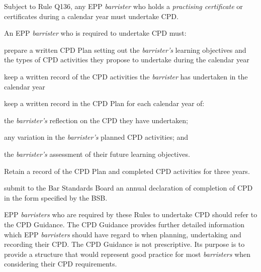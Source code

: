 


Subject to Rule Q136, any EPP \emph{barrister} who holds a
\emph{practising certificate} or certificates during a calendar year
must undertake CPD.


An EPP \emph{barrister} who is required to undertake CPD must:
\nl
 \item prepare a written CPD Plan setting out the \emph{barrister's}
learning objectives and the types of CPD activities they propose to
undertake during the calendar year

 \item keep a written record of the CPD activities the \emph{barrister} has
undertaken in the calendar year

 \item keep a written record in the CPD Plan for each calendar year of:
\al
 \item the \emph{barrister's} reflection on the CPD they have undertaken;

 \item any variation in the \emph{barrister's} planned CPD activities; and

 \item the \emph{barrister's} assessment of their future learning
objectives.\la

 \item  Retain a record of the CPD Plan and completed CPD activities for
three years.

 \item submit to the Bar Standards Board an annual declaration of completion
of CPD in the form specified by the BSB.\ln





EPP \emph{barristers} who are required by these Rules to undertake CPD
should refer to the CPD Guidance. The CPD Guidance provides further
detailed information which EPP \emph{barristers} should have regard to
when planning, undertaking and recording their CPD. The CPD Guidance is
not prescriptive. Its purpose is to provide a structure that would
represent good practice for most \emph{barristers} when considering
their CPD requirements.


